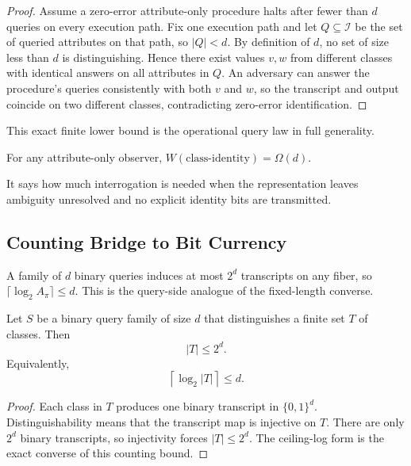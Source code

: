 \begin{proof}
Assume a zero-error attribute-only procedure halts after fewer than $d$ queries on every execution path. Fix one execution path and let $Q \subseteq \mathcal I$ be the set of queried attributes on that path, so $|Q|<d$. By definition of $d$, no set of size less than $d$ is distinguishing. Hence there exist values $v,w$ from different classes with identical answers on all attributes in $Q$. An adversary can answer the procedure's queries consistently with both $v$ and $w$, so the transcript and output coincide on two different classes, contradicting zero-error identification.
\end{proof}

This exact finite lower bound is the operational query law in full generality.

\begin{corollary}\label{cor:attribute-only-witness-lb}
For any attribute-only observer, $W(\text{class-identity}) = \Omega(d)$.
\end{corollary}

It says how much interrogation is needed when the representation leaves ambiguity unresolved and no explicit identity bits are transmitted.

\subsection{Counting Bridge to Bit Currency}

A family of $d$ binary queries induces at most $2^d$ transcripts on any fiber, so $\lceil \log_2 A_{\pi} \rceil \le d$. This is the query-side analogue of the fixed-length converse.

\begin{proposition}\label{prop:binary-query-counting-bound}
Let $S$ be a binary query family of size $d$ that distinguishes a finite set $T$ of classes. Then
\[
|T| \le 2^d.
\]
Equivalently,
\[
\left\lceil \log_2 |T| \right\rceil \le d.
\]
\end{proposition}

\begin{proof}
Each class in $T$ produces one binary transcript in $\{0,1\}^d$. Distinguishability means that the transcript map is injective on $T$. There are only $2^d$ binary transcripts, so injectivity forces $|T| \le 2^d$. The ceiling-log form is the exact converse of this counting bound.
\end{proof}

